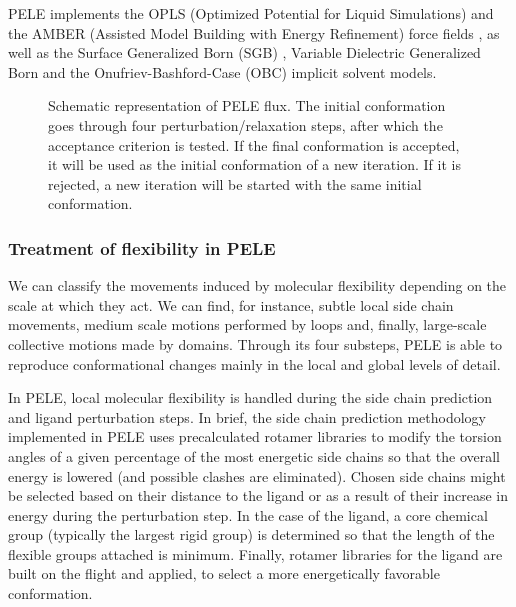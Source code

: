 PELE implements the OPLS (Optimized Potential for Liquid Simulations) \cite{jorgensen_opls_1988, jorgensen_development_1996-1} and the AMBER (Assisted Model Building with Energy Refinement) force fields \cite{ponder_force_2003}, as well as  the Surface Generalized Born (SGB) \cite{ghosh_generalized_1998, romanov_surface_2004}, Variable Dielectric Generalized Born \cite{zhu_improved_2007} and the Onufriev-Bashford-Case (OBC) \cite{onufriev_exploring_2004} implicit solvent models. 

\begin{figure}
\caption{Schematic representation of PELE flux. The initial conformation goes through four perturbation/relaxation steps, after which the acceptance criterion is tested. If the final conformation is accepted, it will be used as the initial conformation of a new iteration. If it is rejected, a new iteration will be started with the same initial conformation.}
\label{fig:pele_scheme}
\end{figure}

\subsubsection{Treatment of flexibility in PELE}
We can classify the movements induced by molecular flexibility depending on the scale at which they act. We can find, for instance, subtle local side chain movements, medium scale motions performed by loops and, finally, large-scale collective motions made by domains. Through its four substeps, PELE is able to reproduce conformational changes mainly in the local and global levels of detail. 

In PELE, local molecular flexibility  is handled during the side chain prediction and ligand perturbation steps. In brief, the side chain prediction methodology \cite{andrec_complete_2002-1, jacobson_force_2002} implemented in PELE uses precalculated rotamer libraries \cite{xiang_prediction_2007} to modify the torsion angles of a given percentage of the most energetic side chains so that the overall energy is lowered (and possible clashes are eliminated). Chosen side chains might be selected based on their distance to the ligand or as a result of their increase in energy during the perturbation step. In the case of the ligand, a core chemical group (typically the largest rigid group) is determined so that the length of the flexible groups attached is minimum. Finally, rotamer libraries for the ligand are built on the flight and applied, to select a more energetically favorable conformation.

